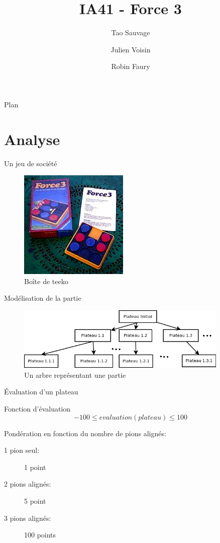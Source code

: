 \documentclass{beamer}
\title{IA41 - Force 3}
\author{Tao Sauvage \and Julien Voisin \and Robin Faury}
\institute[UTBM]{Université de Technologie de Belfort Montbéliard}
\begin{document}
\begin{frame}
	\titlepage
\end{frame}


\begin{frame}{Plan}
    \tableofcontents
\end{frame}


\section{Analyse}

\begin{frame}{Un jeu de société}
  \begin{figure}
    \includegraphics[height=0.6\textheight]{./pix/plateau}
    \centering
    \caption{Boîte de teeko}
  \end{figure}
\end{frame}


\begin{frame}{Modélisation de la partie}
  \begin{figure}
    \includegraphics[width=0.9\textwidth]{./pix/arbre}
    \centering
    \caption{Un arbre représentant une partie}
  \end{figure}
\end{frame}


\begin{frame}{Évaluation d'un plateau}
    \begin{block}{Fonction d'évaluation}
        $$-100 \leq evaluation(plateau) \leq 100$$
    \end{block}
    \begin{block}{Pondération en fonction du nombre de pions alignés:}
        \begin{description}
            \item[1 pion seul:] 1 point 
            \item[2 pions alignés:] 5 point
            \item[3 pions alignés:] 100 points
        \end{description}
    \end{block}
\end{frame}
\end{document}
